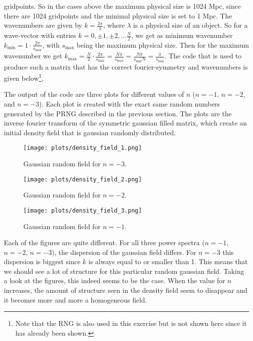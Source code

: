 gridpoints. So in the cases above the maximum physical size is 1024 Mpc, since there are 1024 gridpoints and the minimal physical size is set to 1 Mpc. The wavenumbers are given by $k = \frac{2\pi}{\lambda}$, where $\lambda$ is a physical size of an object. So for a wave-vector with entries $k = 0, \pm 1, \pm 2, ... \frac{N}{2}$, we get as minimum wavenumber $k_{\mathrm{min}} = 1\cdot\frac{2\pi}{s_{\mathrm{max}}}$, with $s_{\mathrm{max}}$ being the maximum physical size. Then for the maximum wavenumber we get $k_{\mathrm{max}} = \frac{N}{2}\cdot \frac{2\pi}{s_{\mathrm{max}}} = \frac{N\pi}{s_{\mathrm{max}}} = \frac{N\pi}{s_{\mathrm{min}}N} = \frac{\pi}{s_{\mathrm{min}}}$.
The code that is used to produce such a matrix that has the correct fourier-symmetry and wavenumbers is given below\footnote{Note that the RNG is also used in this exercise but is not shown here since it has already been shown.},



The output of the code are three plots for different values of $n$ ($n = -1$, $n = -2$, and $n = -3$). Each plot is created with the exact same random numbers generated by the PRNG described in the previous section. The plots are the inverse fourier transform of the symmetric gaussian filled matrix, which create an initial density field that is gaussian randomly distributed. 

\begin{figure}[h]
\vspace{-1.2em}
\centering
\texttt{[image: plots/density\_field\_1.png]}
\vspace{-1.5em}
\caption{Gaussian random field for $n = -3$.}
\label{n_3}
\end{figure} 
\begin{figure}[h]
\vspace{-2.5em}
\centering
\texttt{[image: plots/density\_field\_2.png]}
\vspace{-1em}
\caption{Gaussian random field for $n = -2$.}
\end{figure} 
\begin{figure}[h]
\centering
\texttt{[image: plots/density\_field\_3.png]}
\caption{Gaussian random field for $n = -1$.}
\end{figure} 
Each of the figures are quite different. For all three power spectra ($n=-1$, $n=-2$, $n=-3$), the dispersion of the gaussian field differs. For $n=-3$ this dispersion is biggest since $k$ is always equal to or smaller than 1. This means that we should see a lot of structure for this particular random gaussian field. Taking a look at the figures, this indeed seems to be the case. When the value for $n$ increases, the amount of structure seen in the density field seem to disappear and it becomes more and more a homogeneous field. 
